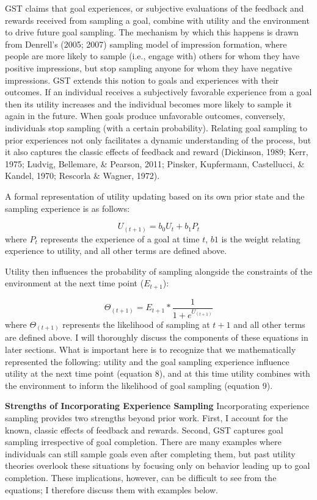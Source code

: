 \documentclass[english,,man]{apa6}
\theoremstyle{definition}
\theoremstyle{definition}
\theoremstyle{definition}
\theoremstyle{remark}
\begin{document}
GST claims that goal experiences, or subjective evaluations of the
feedback and rewards received from sampling a goal, combine with utility
and the environment to drive future goal sampling. The mechanism by
which this happens is drawn from Denrell's (2005; 2007) sampling model
of impression formation, where people are more likely to sample (i.e.,
engage with) others for whom they have positive impressions, but stop
sampling anyone for whom they have negative impressions. GST extends
this notion to goals and experiences with their outcomes. If an
individual receives a subjectively favorable experience from a goal then
its utility increases and the individual becomes more likely to sample
it again in the future. When goals produce unfavorable outcomes,
conversely, individuals stop sampling (with a certain probability).
Relating goal sampling to prior experiences not only facilitates a
dynamic understanding of the process, but it also captures the classic
effects of feedback and reward (Dickinson, 1989; Kerr, 1975; Ludvig,
Bellemare, \& Pearson, 2011; Pinsker, Kupfermann, Castellucci, \&
Kandel, 1970; Rescorla \& Wagner, 1972).

A formal representation of utility updating based on its own prior state
and the sampling experience is as follows:

\begin{equation}
U_{(t+1)} = b_0 U_{t} + b_1 P_t
\end{equation} \noindent where \(P_t\) represents the experience of a
goal at time \(t\), \(b1\) is the weight relating experience to utility,
and all other terms are defined above.

Utility then influences the probability of sampling alongside the
constraints of the environment at the next time point (\(E_{t+1}\)):

\begin{equation}
\Theta_{(t+1)} = E_{t+1} * {\frac {1}{1 + e^{U_{(t+1)}}}}
\end{equation} \noindent where \(\Theta_{(t+1)}\) represents the
likelihood of sampling at \(t+1\) and all other terms are defined above.
I will thoroughly discuss the components of these equations in later
sections. What is important here is to recognize that we mathematically
represented the following: utility and the goal sampling experience
influence utility at the next time point (equation 8), and at this time
utility combines with the environment to inform the likelihood of goal
sampling (equation 9).

\textbf{Strengths of Incorporating Experience Sampling} Incorporating
experience sampling provides two strengths beyond prior work. First, I
account for the known, classic effects of feedback and rewards. Second,
GST captures goal sampling irrespective of goal completion. There are
many examples where individuals can still sample goals even after
completing them, but past utility theories overlook these situations by
focusing only on behavior leading up to goal completion. These
implications, however, can be difficult to see from the equations; I
therefore discuss them with examples below.
\end{document}
